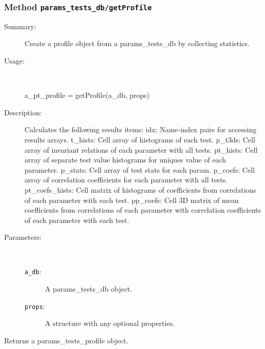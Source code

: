 \subsubsection[Method \texttt{getProfile}]{Method \texttt{params\_tests\_db/getProfile}}%
%
\label{ref_params_tests_db__getProfile}%
\hypertarget{ref_params_tests_db__getProfile}{}%
\begin{description}
\item[Summary:]Create a profile object from a params\_tests\_db by collecting
			 statistics.
%
\item[Usage:]~%
\begin{lyxcode}%
a\_pt\_profile = getProfile(a\_db, props)
%
\end{lyxcode}%
%
\item[Description:]%
Calculates the following results items:
	idx: Name-index pairs for accessing results arrays.
	t\_hists: Cell array of histograms of each test.
	p\_t3ds: Cell array of invariant relations of each parameter with all tests.
	pt\_hists: Cell array of separate test value histograms 
		for uniques value of each parameter.
	p\_stats: Cell array of test stats for each param.
	p\_coefs: Cell array of correlation coefficients 
		for each parameter with all tests.
	pt\_coefs\_hists: Cell matrix of histograms of coefficients from 
		correlations of each parameter with each test.
	pp\_coefs: Cell 3D matrix of mean coefficients from 
		correlations of each parameter with correlation 
		coefficients of each parameter with each test.		
\item[Parameters:]~
\begin{description}%
\item[\texttt{a\_db}:]
 A params\_tests\_db object.
\item[\texttt{props}:]
 A structure with any optional properties.
\end{description}%
%
\item[Returns a params\_tests\_profile object.
]~


\end{description}
